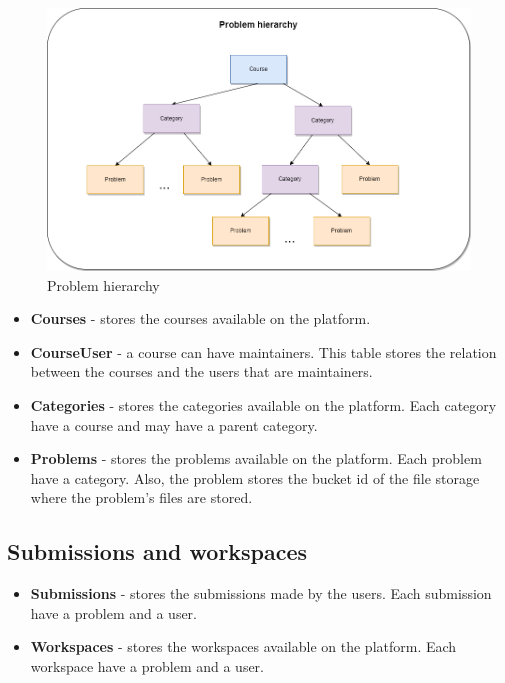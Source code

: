 \documentclass[12pt,a4paper]{report}
\begin{document}
\begin{figure}[h]
	\centering
	\includegraphics[width=\linewidth]{../photos/problem-hierarchy.png}
	\caption{Problem hierarchy}
	\label{fig:problem-hierarchy}
\end{figure}

\begin{itemize}
	\item \textbf{Courses} - stores the courses available on the platform.
	\item \textbf{CourseUser} - a course can have maintainers. This table stores the relation between the courses and the users that are maintainers.
	\item \textbf{Categories} - stores the categories available on the platform. Each category have a course and may have a parent category.
	\item \textbf{Problems} - stores the problems available on the platform. Each problem have a category. Also, the problem stores the bucket id of the file storage where the problem's files are stored.
\end{itemize}

\subsection{Submissions and workspaces}

\begin{itemize}
	\item \textbf{Submissions} - stores the submissions made by the users. Each submission have a problem and a user.
	\item \textbf{Workspaces} - stores the workspaces available on the platform. Each workspace have a problem and a user.
\end{itemize}
\end{document}
